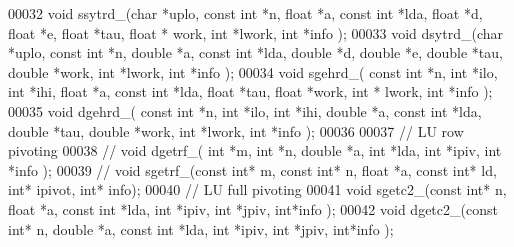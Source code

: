 \begin{DoxyCode}
00032   \textcolor{keywordtype}{void} ssytrd\_(\textcolor{keywordtype}{char} *uplo, \textcolor{keyword}{const} \textcolor{keywordtype}{int} *n, \textcolor{keywordtype}{float} *a, \textcolor{keyword}{const} \textcolor{keywordtype}{int} *lda, \textcolor{keywordtype}{float} *d, \textcolor{keywordtype}{float} *e, \textcolor{keywordtype}{float} *tau, \textcolor{keywordtype}{float} *
      work, \textcolor{keywordtype}{int} *lwork, \textcolor{keywordtype}{int} *info );
00033   \textcolor{keywordtype}{void} dsytrd\_(\textcolor{keywordtype}{char} *uplo, \textcolor{keyword}{const} \textcolor{keywordtype}{int} *n, \textcolor{keywordtype}{double} *a, \textcolor{keyword}{const} \textcolor{keywordtype}{int} *lda, \textcolor{keywordtype}{double} *d, \textcolor{keywordtype}{double} *e, \textcolor{keywordtype}{double} *tau, \textcolor{keywordtype}{
      double} *work, \textcolor{keywordtype}{int} *lwork, \textcolor{keywordtype}{int} *info );
00034   \textcolor{keywordtype}{void} sgehrd\_( \textcolor{keyword}{const} \textcolor{keywordtype}{int} *n, \textcolor{keywordtype}{int} *ilo, \textcolor{keywordtype}{int} *ihi, \textcolor{keywordtype}{float} *a, \textcolor{keyword}{const} \textcolor{keywordtype}{int} *lda, \textcolor{keywordtype}{float} *tau, \textcolor{keywordtype}{float} *work, \textcolor{keywordtype}{int} *
      lwork, \textcolor{keywordtype}{int} *info );
00035   \textcolor{keywordtype}{void} dgehrd\_( \textcolor{keyword}{const} \textcolor{keywordtype}{int} *n, \textcolor{keywordtype}{int} *ilo, \textcolor{keywordtype}{int} *ihi, \textcolor{keywordtype}{double} *a, \textcolor{keyword}{const} \textcolor{keywordtype}{int} *lda, \textcolor{keywordtype}{double} *tau, \textcolor{keywordtype}{double} *work, \textcolor{keywordtype}{int}
       *lwork, \textcolor{keywordtype}{int} *info );
00036 
00037   \textcolor{comment}{// LU row pivoting}
00038 \textcolor{comment}{//   void dgetrf\_( int *m, int *n, double *a, int *lda, int *ipiv, int *info );}
00039 \textcolor{comment}{//   void sgetrf\_(const int* m, const int* n, float *a, const int* ld, int* ipivot, int* info);}
00040   \textcolor{comment}{// LU full pivoting}
00041   \textcolor{keywordtype}{void} sgetc2\_(\textcolor{keyword}{const} \textcolor{keywordtype}{int}* n, \textcolor{keywordtype}{float} *a, \textcolor{keyword}{const} \textcolor{keywordtype}{int} *lda, \textcolor{keywordtype}{int} *ipiv, \textcolor{keywordtype}{int} *jpiv, \textcolor{keywordtype}{int}*info );
00042   \textcolor{keywordtype}{void} dgetc2\_(\textcolor{keyword}{const} \textcolor{keywordtype}{int}* n, \textcolor{keywordtype}{double} *a, \textcolor{keyword}{const} \textcolor{keywordtype}{int} *lda, \textcolor{keywordtype}{int} *ipiv, \textcolor{keywordtype}{int} *jpiv, \textcolor{keywordtype}{int}*info );

\end{DoxyCode}
